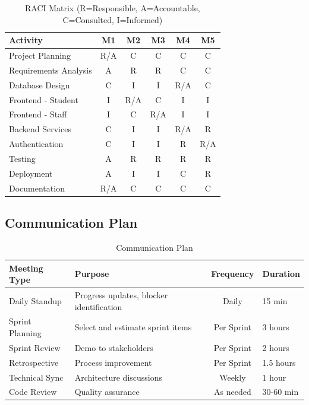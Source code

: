 \documentclass[12pt,a4paper]{article}
\begin{document}
\begin{table}[H]
\centering
\small
\begin{tabular}{|l|c|c|c|c|c|}
\hline
\textbf{Activity} & \textbf{M1} & \textbf{M2} & \textbf{M3} & \textbf{M4} & \textbf{M5} \\
\hline
Project Planning & R/A & C & C & C & C \\
Requirements Analysis & A & R & R & C & C \\
Database Design & C & I & I & R/A & C \\
Frontend - Student & I & R/A & C & I & I \\
Frontend - Staff & I & C & R/A & I & I \\
Backend Services & C & I & I & R/A & R \\
Authentication & C & I & I & R & R/A \\
Testing & A & R & R & R & R \\
Deployment & A & I & I & C & R \\
Documentation & R/A & C & C & C & C \\
\hline
\end{tabular}
\caption{RACI Matrix (R=Responsible, A=Accountable, C=Consulted, I=Informed)}
\end{table}

\subsection{Communication Plan}

\begin{table}[H]
\centering
\begin{tabularx}{\textwidth}{|l|X|c|l|}
\hline
\textbf{Meeting Type} & \textbf{Purpose} & \textbf{Frequency} & \textbf{Duration} \\
\hline
Daily Standup & Progress updates, blocker identification & Daily & 15 min \\
\hline
Sprint Planning & Select and estimate sprint items & Per Sprint & 3 hours \\
\hline
Sprint Review & Demo to stakeholders & Per Sprint & 2 hours \\
\hline
Retrospective & Process improvement & Per Sprint & 1.5 hours \\
\hline
Technical Sync & Architecture discussions & Weekly & 1 hour \\
\hline
Code Review & Quality assurance & As needed & 30-60 min \\
\hline
\end{tabularx}
\caption{Communication Plan}
\end{table}
\end{document}
